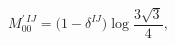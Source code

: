 \begin{equation}
M_{00}^{\prime\,IJ}=\bigl(1-\delta^{IJ}\bigr)\log\frac{3\sqrt{3}}{4},
\end{equation}

